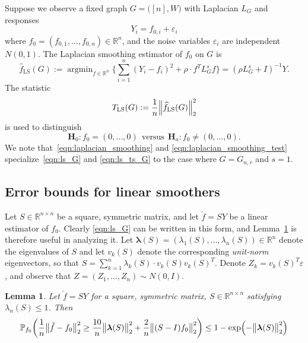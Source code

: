\documentclass{article}
\newcommand{\Reals}{\mathbb{R}}
\newcommand{\1}{\mathbf{1}}
\DeclareMathOperator*{\argmin}{argmin}
\newcommand{\lambdavec}{\boldsymbol{\lambda}}
\newcommand{\Lap}{L}
\newcommand{\Id}{I}
\newcommand{\Pbb}{\mathbb{P}}
\newcommand{\wh}[1]{\widehat{#1}}
\newcommand{\LS}{\mathrm{LS}}
\theoremstyle{alden}
\theoremstyle{aldenthm}
\newtheorem{lemma}{Lemma}
\theoremstyle{definition}
\theoremstyle{remark}
\begin{document}
Suppose we observe a fixed graph $G = \bigl([n],W\bigr)$ with Laplacian $\Lap_G$ and responses
\begin{equation}
\label{eqn:fixed_graph_regression_model}
Y_i = f_{0,i} + \varepsilon_i
\end{equation}
where $f_0 = (f_{0,1},\ldots,f_{0,n}) \in \Reals^n$, and the noise variables $\varepsilon_i$ are independent $N(0,1)$. The Laplacian smoothing estimator of $f_0$ on $G$ is
\begin{equation}
\label{eqn:ls_G}
\wh{f}_{\LS}(G) := \argmin_{f \in \Reals^n} \biggl\{ \sum_{i = 1}^{n}(Y_i - f_i)^2 + \rho \cdot f^T \Lap_G^{s}  f \biggr\} = (\rho \Lap_G^s + \Id)^{-1}Y.
\end{equation}
The statistic
\begin{equation}
\label{eqn:ls_ts_G}
T_{\LS}(G) := \frac{1}{n} \Bigl\|\wh{f}_{\LS}(G)\Bigr\|_2^2 
\end{equation}
is used to distinguish
\begin{equation*}
\mathbf{H}_0: f_{0} = (0,...,0) ~~\textrm{versus}~~ \mathbf{H}_a: f_{0} \neq (0,...,0).
\end{equation*}
We note that~\eqref{eqn:laplacian_smoothing} and \eqref{eqn:laplacian_smoothing_test} specialize~\eqref{eqn:ls_G} and \eqref{eqn:ls_ts_G} to the case where $G = G_{n,r}$ and $s = 1$.

\subsection{Error bounds for linear smoothers}
Let $S \in \Reals^{n \times n}$ be a square, symmetric matrix, and let $\check{f} = SY$ be a linear estimator of $f_0$. Clearly \eqref{eqn:ls_G} can be written in this form, and Lemma~\ref{lem:linear_smoother_fixed_graph_estimation} is therefore useful in analyzing it. Let $\lambdavec(S) = (\lambda_1(S),\ldots,\lambda_n(S)) \in \Reals^n$ denote the eigenvalues of $S$ and let $v_k(S)$ denote the corresponding \emph{unit-norm} eigenvectors, so that $S = \sum_{k = 1}^{n} \lambda_k(S) \cdot v_k(S) v_k(S)^T$. Denote $Z_k = v_k(S)^T \varepsilon$, and observe that $Z = (Z_1,\ldots,Z_n) \sim N(0,\Id)$. 

\begin{lemma}
	\label{lem:linear_smoother_fixed_graph_estimation}
	Let $\check{f} = SY$ for a square, symmetric matrix, $S \in \Reals^{n \times n}$ satisfying $\lambda_n(S) \leq 1$. Then
	\begin{equation*}
	\Pbb_{f_0}\biggl(\frac{1}{n}\bigl\|\check{f} - f_0\bigr\|_2^2 \geq \frac{10}{n} \bigl\|\lambdavec(S)\bigr\|_2^2 + \frac{2}{n}\bigl\|(S - I)f_0\bigr\|_2^2\biggr) \leq 1 - \exp\Bigl(-\bigl\|\lambdavec(S)\bigr\|_2^2\Bigr)
	\end{equation*}
\end{lemma}
\end{document}
